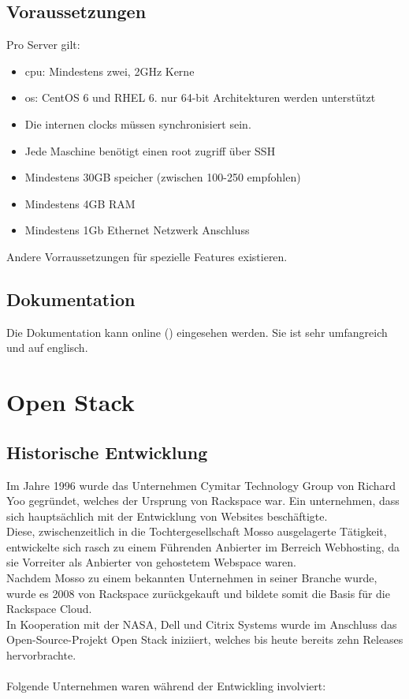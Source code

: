 \documentclass[a4paper,nochapterprefix,ngerman,12pt]{scrreprt}
\begin{document}
\section{Voraussetzungen}
Pro Server gilt:
\begin{itemize}
\item \gls{cpu}: Mindestens zwei, 2GHz Kerne
\item \gls{os}:  CentOS 6 und RHEL 6. nur 64-bit Architekturen werden unterstützt
\item Die internen clocks müssen synchronisiert sein.
\item Jede Maschine benötigt einen root zugriff über SSH
\item Mindestens 30GB speicher (zwischen 100-250 empfohlen)
\item Mindestens 4GB RAM
\item Mindestens 1Gb Ethernet Netzwerk Anschluss
\end{itemize}
Andere Vorraussetzungen für spezielle Features existieren. \cite{EucalyptusRequ}
\section{Dokumentation}
Die Dokumentation kann online (\cite{EucalyptusDoc}) eingesehen werden.
Sie ist sehr umfangreich und auf englisch.


\chapter{Open Stack} \thispagestyle{fancy}
\section{Historische Entwicklung}
Im Jahre 1996 wurde das Unternehmen Cymitar Technology Group von Richard Yoo gegründet, welches der Ursprung von Rackspace war.
Ein unternehmen, dass sich hauptsächlich mit der Entwicklung von Websites beschäftigte.\\
Diese, zwischenzeitlich in die Tochtergesellschaft Mosso ausgelagerte Tätigkeit, entwickelte sich rasch zu einem Führenden Anbierter im Berreich Webhosting, da sie Vorreiter als Anbierter von gehostetem Webspace waren.\\
Nachdem Mosso zu einem bekannten Unternehmen in seiner Branche wurde, wurde es 2008 von Rackspace zurückgekauft und bildete somit die Basis für die Rackspace Cloud.\\
In Kooperation mit der NASA, Dell und Citrix Systems wurde im Anschluss das Open-Source-Projekt Open Stack iniziiert, welches bis heute bereits zehn Releases hervorbrachte.\\
\\
Folgende Unternehmen waren während der Entwickling involviert: \\
\end{document}
